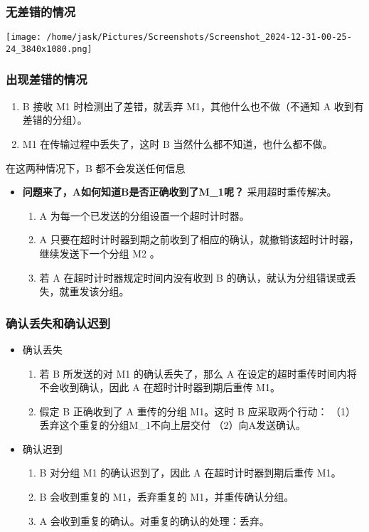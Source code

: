 \documentclass[11pt]{article}
\begin{document}
\subsubsection{无差错的情况}
\label{sec:org5856b44}
\begin{center}
\texttt{[image: /home/jask/Pictures/Screenshots/Screenshot\_2024-12-31-00-25-24\_3840x1080.png]}
\end{center}
\subsubsection{出现差错的情况}
\label{sec:orge68dfcf}
\begin{enumerate}
\item B 接收 M1 时检测出了差错，就丢弃 M1，其他什么也不做（不通知 A 收到有差错的分组）。
\item M1 在传输过程中丢失了，这时 B 当然什么都不知道，也什么都不做。
\end{enumerate}
在这两种情况下，B 都不会发送任何信息
\begin{itemize}
\item \textbf{问题来了，A如何知道B是否正确收到了M\_1呢？}
采用超时重传解决。
\begin{enumerate}
\item A 为每一个已发送的分组设置一个超时计时器。
\item A 只要在超时计时器到期之前收到了相应的确认，就撤销该超时计时器，继续发送下一个分组 M2 。
\item 若 A 在超时计时器规定时间内没有收到 B 的确认，就认为分组错误或丢失，就重发该分组。
\end{enumerate}
\end{itemize}
\subsubsection{确认丢失和确认迟到}
\label{sec:org39ef270}
\begin{itemize}
\item 确认丢失
\begin{enumerate}
\item 若 B 所发送的对 M1 的确认丢失了，那么 A 在设定的超时重传时间内将不会收到确认，因此 A 在超时计时器到期后重传 M1。
\item 假定 B 正确收到了 A 重传的分组 M1。这时 B 应采取两个行动：
（1）丢弃这个重复的分组M\_1不向上层交付
（2）向A发送确认。
\end{enumerate}
\item 确认迟到
\begin{enumerate}
\item B 对分组 M1 的确认迟到了，因此 A 在超时计时器到期后重传 M1。
\item B 会收到重复的 M1，丢弃重复的 M1，并重传确认分组。
\item A 会收到重复的确认。对重复的确认的处理：丢弃。
\end{enumerate}
\end{itemize}
\end{document}

